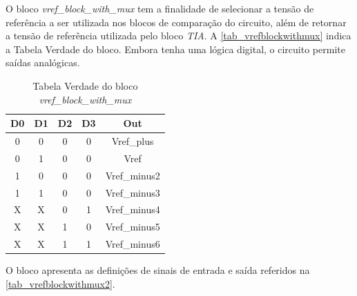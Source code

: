 \renewcommand{\NomeBloco}{\emph{vref\_block\_with\_mux}}
\renewcommand{\NomeBlocoA}{vrefblockwithmux}
\renewcommand{\NomePTab}{tab_\NomeBlocoA}
\renewcommand{\NomeSTab}{tab_\NomeBlocoA2}
\renewcommand{\NomePFig}{fig_\NomeBlocoA}
\renewcommand{\NomeSFig}{fig_\NomeBlocoA2}
\renewcommand{\NomeTTab}{tab_\NomeBlocoA3}

O bloco \NomeBloco{} tem a finalidade de selecionar a tens\~ao de refer\^encia a ser utilizada nos blocos de compara{\c c}\~ao do circuito, al\'em de retornar a tens\~ao de refer\^encia utilizada pelo bloco \emph{TIA}. A \autoref{\NomePTab} indica a Tabela Verdade do bloco. Embora tenha uma l\'ogica digital, o circuito permite sa\'idas anal\'ogicas.

\begin{table}[htbp]

\caption{Tabela Verdade do bloco \NomeBloco}%
\label{\NomePTab}
\centering
\begin{tabular}{ccccc}
    \toprule
    D0 & D1 & D2 & D3 & Out \\
    \midrule \midrule
    0 & 0 & 0 & 0 & Vref\_plus\\
    \midrule
    0 & 1 & 0 & 0 & Vref\\
    \midrule
    1 & 0 & 0 & 0 & Vref\_minus2\\
    \midrule
    1 & 1 & 0 & 0 & Vref\_minus3\\
    \midrule
    X & X & 0 & 1 & Vref\_minus4\\
    \midrule
    X & X & 1 & 0 & Vref\_minus5\\
    \midrule
    X & X & 1 & 1 & Vref\_minus6\\
\bottomrule

\end{tabular}
\end{table}

O bloco apresenta as defini{\c c}\~oes de sinais de entrada e sa\'ida referidos na \autoref{\NomeSTab}.

